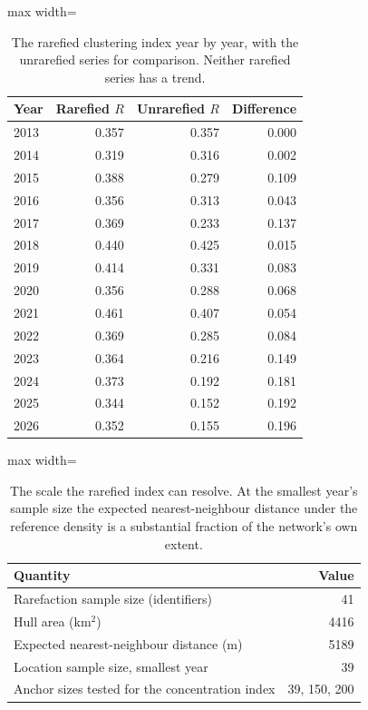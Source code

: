 \documentclass[fleqn,10pt]{wlpeerj}
\begin{document}
\begin{table}[H]
\centering
\caption{The rarefied clustering index year by year, with the unrarefied series for
comparison. Neither rarefied series has a trend.}
\label{si:rarer}
\small
\begin{adjustbox}{max width=\linewidth}
\begin{tabular}{lrrr}
\toprule
Year & Rarefied $R$ & Unrarefied $R$ & Difference \\
\midrule
2013 & 0.357 & 0.357 & 0.000 \\
2014 & 0.319 & 0.316 & 0.002 \\
2015 & 0.388 & 0.279 & 0.109 \\
2016 & 0.356 & 0.313 & 0.043 \\
2017 & 0.369 & 0.233 & 0.137 \\
2018 & 0.440 & 0.425 & 0.015 \\
2019 & 0.414 & 0.331 & 0.083 \\
2020 & 0.356 & 0.288 & 0.068 \\
2021 & 0.461 & 0.407 & 0.054 \\
2022 & 0.369 & 0.285 & 0.084 \\
2023 & 0.364 & 0.216 & 0.149 \\
2024 & 0.373 & 0.192 & 0.181 \\
2025 & 0.344 & 0.152 & 0.192 \\
2026 & 0.352 & 0.155 & 0.196 \\
\bottomrule
\end{tabular}
\end{adjustbox}
\end{table}

\begin{table}[H]
\centering
\caption{The scale the rarefied index can resolve. At the smallest year's sample size the
expected nearest-neighbour distance under the reference density is a substantial fraction of the
network's own extent.}
\label{si:scale}
\small
\begin{adjustbox}{max width=\linewidth}
\begin{tabular}{lr}
\toprule
Quantity & Value \\
\midrule
Rarefaction sample size (identifiers) & 41 \\
Hull area (km$^2$) & 4416 \\
Expected nearest-neighbour distance (m) & 5189 \\
Location sample size, smallest year & 39 \\
Anchor sizes tested for the concentration index & 39, 150, 200 \\
\bottomrule
\end{tabular}
\end{adjustbox}
\end{table}
\end{document}
